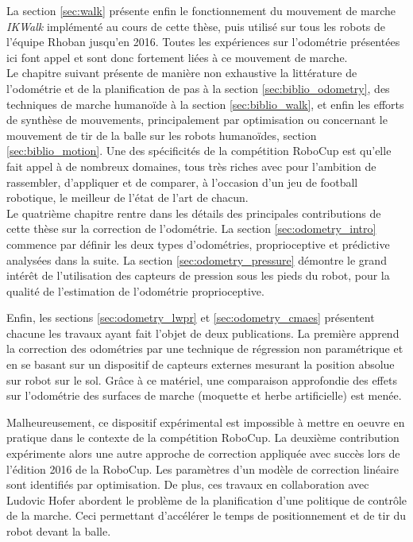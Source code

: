 La section \ref{sec:walk} présente enfin le fonctionnement du mouvement de marche
\textit{IKWalk} implémenté au cours de cette thèse, puis utilisé sur tous les robots 
de l'équipe Rhoban jusqu'en 2016. Toutes les expériences sur l'odométrie
présentées ici font appel et sont donc fortement liées à ce mouvement de marche.\\

Le chapitre suivant présente de manière non exhaustive la littérature
de l'odométrie et de la planification de pas à la section \ref{sec:biblio_odometry}, 
des techniques de marche humanoïde à la section \ref{sec:biblio_walk}, et enfin les
efforts de synthèse de mouvements, principalement par optimisation ou concernant
le mouvement de tir de la balle sur les robots humanoïdes, section \ref{sec:biblio_motion}.
Une des spécificités de la compétition RoboCup est qu'elle
fait appel à de nombreux domaines, tous très riches avec pour l'ambition 
de rassembler, d'appliquer et de comparer, à l'occasion d'un jeu de football robotique, 
le meilleur de l'état de l'art de chacun.\\

Le quatrième chapitre rentre dans les détails des principales contributions de
cette thèse sur la correction de l'odométrie.
La section \ref{sec:odometry_intro} commence par définir les deux types d'odométries, 
proprioceptive et prédictive analysées dans la suite.
La section \ref{sec:odometry_pressure} démontre le grand intérêt de l'utilisation
des capteurs de pression sous les pieds du robot, pour la qualité de l'estimation
de l'odométrie proprioceptive.

Enfin, les sections \ref{sec:odometry_lwpr} et \ref{sec:odometry_cmaes} présentent 
chacune les travaux ayant fait l'objet de deux publications.
La première apprend la correction des odométries par une technique de régression
non paramétrique et en se basant sur un dispositif de capteurs externes mesurant
la position absolue sur robot sur le sol.
Grâce à ce matériel, une comparaison approfondie des effets sur l'odométrie
des surfaces de marche (moquette et herbe artificielle) est menée.

Malheureusement, ce dispositif expérimental est impossible à mettre en oeuvre
en pratique dans le contexte de la compétition RoboCup.
La deuxième contribution expérimente alors une autre approche de correction
appliquée avec succès lors de l'édition 2016 de la RoboCup.
Les paramètres d'un modèle de correction linéaire sont identifiés par optimisation.
De plus, ces travaux en collaboration avec Ludovic Hofer abordent le problème
de la planification d'une politique de contrôle de la marche.
Ceci permettant d'accélérer le temps de positionnement et de tir du robot 
devant la balle.\\

